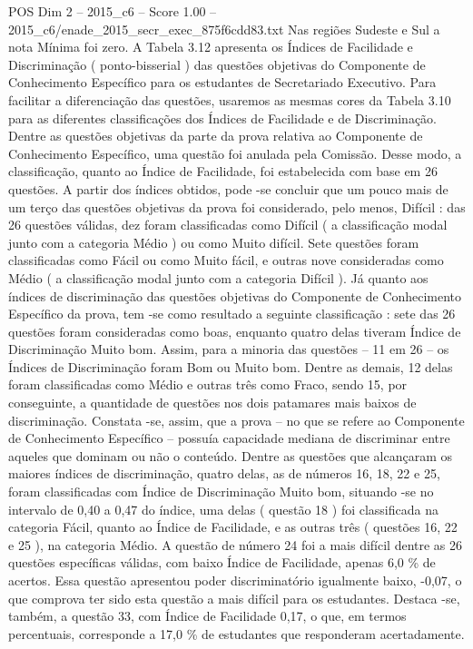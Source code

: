 \begin{textsample}{POS Dim 2 – 2015\_c6 – Score 1.00 – 2015\_c6/enade\_2015\_secr\_exec\_875f6cdd83.txt}
Nas regiões Sudeste e Sul a nota Mínima foi zero.
A Tabela 3.12 apresenta os Índices de Facilidade e Discriminação ( ponto-bisserial ) das questões objetivas do Componente de Conhecimento Específico para os estudantes de Secretariado Executivo.
Para facilitar a diferenciação das questões, usaremos as mesmas cores da Tabela 3.10 para as diferentes classificações dos Índices de Facilidade e de Discriminação.
Dentre as questões objetivas da parte da prova relativa ao Componente de Conhecimento Específico, uma questão foi anulada pela Comissão.
Desse modo, a classificação, quanto ao Índice de Facilidade, foi estabelecida com base em 26 questões.
A partir dos índices obtidos, pode -se concluir que um pouco mais de um terço das questões objetivas da prova foi considerado, pelo menos, Difícil : das 26 questões válidas, dez foram classificadas como Difícil ( a classificação modal junto com a categoria Médio ) ou como Muito difícil.
Sete questões foram classificadas como Fácil ou como Muito fácil, e outras nove consideradas como Médio ( a classificação modal junto com a categoria Difícil ).
Já quanto aos índices de discriminação das questões objetivas do Componente de Conhecimento Específico da prova, tem -se como resultado a seguinte classificação : sete das 26 questões foram consideradas como boas, enquanto quatro delas tiveram Índice de Discriminação Muito bom.
Assim, para a minoria das questões – 11 em 26 – os Índices de Discriminação foram Bom ou Muito bom.
Dentre as demais, 12 delas foram classificadas como Médio e outras três como Fraco, sendo 15, por conseguinte, a quantidade de questões nos dois patamares mais baixos de discriminação.
Constata -se, assim, que a prova – no que se refere ao Componente de Conhecimento Específico – possuía capacidade mediana de discriminar entre aqueles que dominam ou não o conteúdo.
Dentre as questões que alcançaram os maiores índices de discriminação, quatro delas, as de números 16, 18, 22 e 25, foram classificadas com Índice de Discriminação Muito bom, situando -se no intervalo de 0,40 a 0,47 do índice, uma delas ( questão 18 ) foi classificada na categoria Fácil, quanto ao Índice de Facilidade, e as outras três ( questões 16, 22 e 25 ), na categoria Médio.
A questão de número 24 foi a mais difícil dentre as 26 questões específicas válidas, com baixo Índice de Facilidade, apenas 6,0 \% de acertos.
Essa questão apresentou poder discriminatório igualmente baixo, -0,07, o que comprova ter sido esta questão a mais difícil para os estudantes.
Destaca -se, também, a questão 33, com Índice de Facilidade 0,17, o que, em termos percentuais, corresponde a 17,0 \% de estudantes que responderam acertadamente.

\end{textsample}
